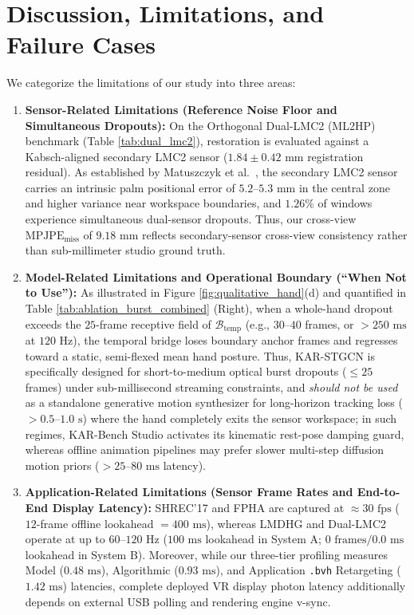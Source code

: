 \documentclass[10pt,twocolumn]{article}
\begin{document}
\section{Discussion, Limitations, and Failure Cases}
We categorize the limitations of our study into three areas:
\begin{enumerate}
    \item \textbf{Sensor-Related Limitations (Reference Noise Floor and Simultaneous Dropouts):} On the Orthogonal Dual-LMC2 (ML2HP) benchmark \cite{gilmartin2024dual} (Table \ref{tab:dual_lmc2}), restoration is evaluated against a Kabsch-aligned secondary LMC2 sensor ($1.84 \pm 0.42\text{ mm}$ registration residual). As established by Matuszczyk et al.\ \cite{matuszczyk2025comparative}, the secondary LMC2 sensor carries an intrinsic palm positional error of $5.2\text{--}5.3\text{ mm}$ in the central zone and higher variance near workspace boundaries, and $1.26\%$ of windows experience simultaneous dual-sensor dropouts. Thus, our cross-view $\text{MPJPE}_{\text{miss}}$ of $9.18\text{ mm}$ reflects secondary-sensor cross-view consistency rather than sub-millimeter studio ground truth.
    \item \textbf{Model-Related Limitations and Operational Boundary (``When Not to Use''):} As illustrated in Figure \ref{fig:qualitative_hand}(d) and quantified in Table \ref{tab:ablation_burst_combined} (Right), when a whole-hand dropout exceeds the $25$-frame receptive field of $\mathcal{B}_{\text{temp}}$ (e.g., $30\text{--}40$ frames, or $>250\text{ ms}$ at $120\text{ Hz}$), the temporal bridge loses boundary anchor frames and regresses toward a static, semi-flexed mean hand posture. Thus, KAR-STGCN is specifically designed for short-to-medium optical burst dropouts ($\le 25$ frames) under sub-millisecond streaming constraints, and \textit{should not be used} as a standalone generative motion synthesizer for long-horizon tracking loss ($>0.5\text{--}1.0\text{ s}$) where the hand completely exits the sensor workspace; in such regimes, KAR-Bench Studio activates its kinematic rest-pose damping guard, whereas offline animation pipelines may prefer slower multi-step diffusion motion priors \cite{rastgoo2025deep} ($>25\text{--}80\text{ ms}$ latency).
    \item \textbf{Application-Related Limitations (Sensor Frame Rates and End-to-End Display Latency):} SHREC'17 \cite{desmedt2017shrec} and FPHA \cite{garcia2018first} are captured at $\approx 30\text{ fps}$ ($12$-frame offline lookahead $= 400\text{ ms}$), whereas LMDHG \cite{boulahia2017dynamic} and Dual-LMC2 \cite{gilmartin2024dual} operate at up to $60\text{--}120\text{ Hz}$ ($100\text{ ms}$ lookahead in System A; $0\text{ frames}/0.0\text{ ms}$ lookahead in System B). Moreover, while our three-tier profiling measures Model ($0.48\text{ ms}$), Algorithmic ($0.93\text{ ms}$), and Application \texttt{.bvh} Retargeting ($1.42\text{ ms}$) latencies, complete deployed VR display photon latency additionally depends on external USB polling and rendering engine v-sync.
\end{enumerate}
\end{document}
